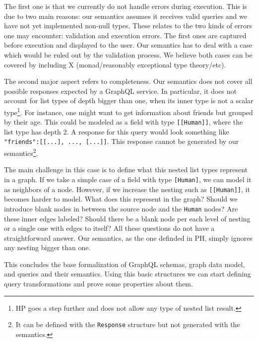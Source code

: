 The first one is that we currently do not handle errors during execution. This is due to two main reasons: our semantics assumes it receives valid queries and we have not yet implemented non-null types. These relates to the two kinds of errors one may encounter: validation and execution errors. The first ones are captured before execution and displayed to the user. Our semantics has to deal with a case which would be ruled out by the validation process. We believe both cases can be covered by including X (monad/reasonably exceptional type theory/etc).

The second major aspect refers to completeness. Our semantics does not cover all possible responses expected by a GraphQL service. In particular, it does not account for list types of depth bigger than one, when its inner type is not a scalar type\footnote{HP goes a step further and does not allow any type of nested list result.}. For instance, one might want to get information about friends but grouped by their age. This could be modeled as a field with type \texttt{[[Human]]}, where the list type has depth 2. A response for this query would look something like \texttt{"friends":[[...], ..., [...]]}. This response cannot be generated by our semantics\footnote{It can be defined with the \texttt{Response} structure but not generated with the semantics.}.

The main challenge in this case is to define what this nested list types represent in a graph. If we take a simple case of a field with type \texttt{[Human]}, we can model it as neighbors of a node. However, if we increase the nesting such as \texttt{[[Human]]}, it becomes harder to model. What does this represent in the graph? Should we introduce blank nodes in between the source node and the \texttt{Human} nodes? Are these inner edges labeled? Should there be a blank node per each level of nesting or a single one with edges to itself? All these questions do not have a straightforward answer. Our semantics, as the one definded in PH, simply ignores any nesting bigger than one.

This concludes the base formalization of GraphQL schemas, graph data model, and queries and their semantics. Using this basic structures we can start defining query transformations and prove some properties about them. 
